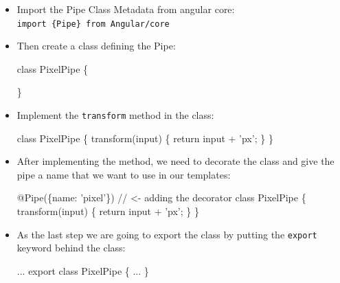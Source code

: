 \documentclass[12pt,]{article}
\newenvironment{Shaded}{}{}
\newcommand{\KeywordTok}[1]{\textcolor[rgb]{0.00,0.00,1.00}{{#1}}}
\newcommand{\CommentTok}[1]{\textcolor[rgb]{0.00,0.50,0.00}{{#1}}}
\newcommand{\FunctionTok}[1]{{#1}}
\newcommand{\NormalTok}[1]{{#1}}
\begin{document}
\begin{itemize}
\item
  Import the Pipe Class Metadata from angular core:
  \texttt{import\ \{Pipe\}\ from\ \textquotesingle{}Angular/core\textquotesingle{}}
\item
  Then create a class defining the Pipe:

\begin{Shaded}
\begin{Highlighting}[numbers=left,,]
\KeywordTok{class} \NormalTok{PixelPipe \{}

\NormalTok{\}}
\end{Highlighting}
\end{Shaded}
\item
  Implement the \texttt{transform} method in the class:

\begin{Shaded}
\begin{Highlighting}[numbers=left,,]
\KeywordTok{class} \NormalTok{PixelPipe \{}
  \FunctionTok{transform}\NormalTok{(input) \{}
    \KeywordTok{return} \NormalTok{input + 'px';}
  \NormalTok{\}}
\NormalTok{\}}
\end{Highlighting}
\end{Shaded}
\item
  After implementing the method, we need to decorate the class and give
  the pipe a name that we want to use in our templates:

\begin{Shaded}
\begin{Highlighting}[numbers=left,,]
\FunctionTok{@Pipe}\NormalTok{(\{name: 'pixel'\}) }\CommentTok{// <- adding the decorator}
\KeywordTok{class} \NormalTok{PixelPipe \{}
  \FunctionTok{transform}\NormalTok{(input) \{}
    \KeywordTok{return} \NormalTok{input + 'px';}
  \NormalTok{\}}
\NormalTok{\}}
\end{Highlighting}
\end{Shaded}
\item
  As the last step we are going to export the class by putting the
  \texttt{export} keyword behind the class:

\begin{Shaded}
\begin{Highlighting}[numbers=left,,]
\NormalTok{...}
\NormalTok{export }\KeywordTok{class} \NormalTok{PixelPipe \{}
  \NormalTok{...}
\NormalTok{\}}
\end{Highlighting}
\end{Shaded}
\end{itemize}
\end{document}
